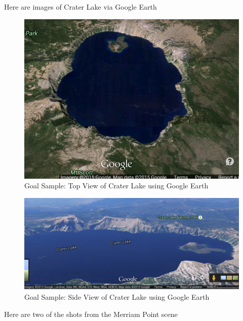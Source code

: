 \documentclass[11pt,psfig]{article}
\begin{document}
Here are images of Crater Lake via Google Earth

\begin{figure}[H]
\centering
\includegraphics[width=\columnwidth]{googleEarthView1.png}
\caption{Goal Sample: Top View of Crater Lake using Google Earth}
\end{figure}
\begin{figure}[H]
\centering
\includegraphics[width=\columnwidth]{googleEarthView2.png}
\caption{Goal Sample: Side View of Crater Lake using Google Earth}
\end{figure}

\newpage

Here are two of the shots from the Merriam Point scene
\end{document}
